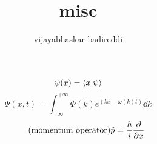 \documentclass[12pt]{article}
\title{misc}
\author{vijayabhaskar badireddi}
\begin{document}
\[\psi(x)=\braket{x}{\psi}\]
\[\Psi(x,t)=\int_{-\infty}^{+\infty}\Phi(k)e^{(kx-\omega(k)t)}\dd{k}\]
\[\tag{momentum operator}\hat{p}=\frac{\hbar}{i}\pdv{x}\]
\end{document}
